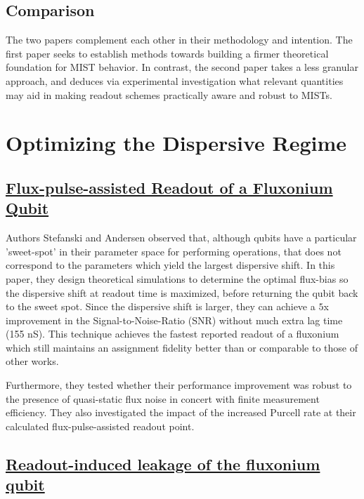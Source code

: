 \documentclass[
 reprint,
 superscriptaddress,
 bibnotes,
 amsmath,
 amssymb,
 aps,
 prb,
 citeautoscript,
 floatfix,
]{revtex4-2}
\begin{document}
\subsection{Comparison}

The two papers complement each other in their methodology and intention. The first paper seeks to establish methods towards building a firmer theoretical foundation for MIST behavior. In contrast, the second paper takes a less granular approach, and deduces via experimental investigation what relevant quantities may aid in making readout schemes practically aware and robust to MISTs.

\section{Optimizing the Dispersive Regime}\label{sec4}
\subsection{\href{https://arxiv.org/abs/2309.17286}{Flux-pulse-assisted Readout of a Fluxonium Qubit}}

Authors Stefanski and Andersen observed that, although qubits have a particular 'sweet-spot' in their parameter space for performing operations, that does not correspond to the parameters which yield the largest dispersive shift. In this paper, they design theoretical simulations to determine the optimal flux-bias so the dispersive shift at readout time is maximized, before returning the qubit back to the sweet spot. Since the dispersive shift is larger, they can achieve a $5$x improvement in the Signal-to-Noise-Ratio (SNR) without much extra lag time (155 nS). This technique achieves the fastest reported readout of a fluxonium which still maintains an assignment fidelity better than or comparable to those of other works. 

Furthermore, they tested whether their performance improvement was robust to the presence of quasi-static flux noise in concert with finite measurement efficiency. They also investigated the impact of the increased Purcell rate at their calculated flux-pulse-assisted readout point.

\subsection{\href{https://arxiv.org/abs/2501.17807}{Readout-induced leakage of the fluxonium qubit}}
\end{document}
